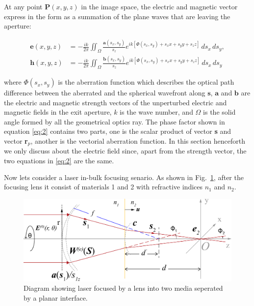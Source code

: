 \documentclass[9pt,twocolumn,twoside]{osajnl}
\begin{document}
At any point $\textbf{P}(x,y,z)$ in the image space, the electric and magnetic vector express in the form as a summation of the plane waves that are leaving the aperture:

\begin{equation}
	\begin{aligned}\label{eq:2}
		\textbf{e}(x, y, z)&=-\frac{ik}{2\pi}\iint_\Omega\frac{\textbf{a}(s_x, s_y)}{s_z}e^{ik[\textbf{$\Phi$}(s_x, s_y)+s_xx+s_yy+s_zz]}\,ds_x\,ds_y,\\
		\textbf{h}(x, y, z)&=-\frac{ik}{2\pi}\iint_\Omega\frac{\textbf{b}(s_x, s_y)}{s_z}e^{ik[\textbf{$\Phi$}(s_x, s_y)+s_xx+s_yy+s_zz]}\,ds_x\,ds_y
	\end{aligned}
\end{equation}

where $\textbf{$\Phi$}(s_x, s_y)$ is the aberration function which describes the optical path difference between the aberrated and the spherical wavefront along $\textbf{s}$, $\textbf{a}$ and $\textbf{b}$ are the electric and magnetic strength vectors of the unperturbed electric and magnetic fields in the exit aperture, $k$ is the wave number, and $\Omega$ is the solid angle formed by all the geometrical optics ray. The phase factor shown in equation \eqref{eq:2} contains two parts, one is the scalar product of vector \textbf{s} and vector \textbf{r}$_p$, another is the vectorial aberration function. In this section henceforth we only discuss about the electric field since, apart from the strength vector, the two equations in \eqref{eq:2} are the same. 

Now lets consider a laser in-bulk focusing senario. As shown in Fig.~\ref{fig:1}, after the focusing lens it consist of materials 1 and 2 with refractive indices $n_1$ and $n_2$.

\begin{figure}
	\centering
	\includegraphics[width=\linewidth]{../AppOptics/figures/vectorDiffractionTheory.pdf}
	\caption{Diagram showing laser focused by a lens into two media seperated by a planar interface.}\label{fig:1}
\end{figure}
\end{document}
